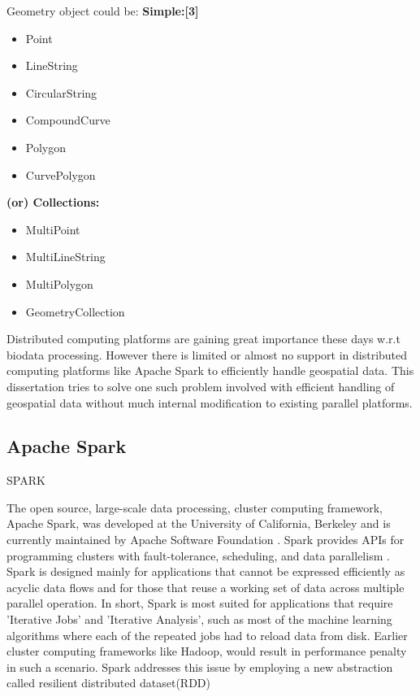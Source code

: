 \documentclass[article,type=msc,colorback,10pt,accentcolor=tud1d]{tudthesis}
\begin{document}
			   Geometry object could be:
			 \textbf{  Simple:[3]}
			 \begin{itemize}
			   \item  Point
			   \item  LineString
			   \item  CircularString
			   \item  CompoundCurve
			   \item  Polygon
			   \item  CurvePolygon
			 \end{itemize}
			   \textbf{(or) Collections:}
			  \begin{itemize}
			  	\item  MultiPoint
			    \item  MultiLineString
			    \item  MultiPolygon
			    \item  GeometryCollection
			  \end{itemize}
			  
			   Distributed computing platforms are gaining great importance these days w.r.t  biodata processing. However there is limited or almost no support in distributed computing platforms like Apache Spark to efficiently handle geospatial data. This dissertation tries to solve one such problem involved with efficient handling of geospatial data without much internal modification to existing parallel platforms.
			   
			   
		   \subsection{Apache Spark}
		   SPARK  \cite{sparkmainpaper}
		   
		   The open source, large-scale data processing, cluster computing framework, Apache Spark, was developed at the University of California, Berkeley and is currently maintained by Apache Software Foundation \cite{http://spark.apache.org/} . Spark provides APIs for programming clusters with fault-tolerance, scheduling, and data parallelism \cite{wiki: https://en.wikipedia.org/wiki/Apache_Spark}. Spark is designed mainly for applications that cannot be expressed efficiently as acyclic data flows and for those that reuse a working set of data across multiple parallel operation. In short, Spark is most suited for applications that require 'Iterative Jobs' and 'Iterative Analysis', such as most of the machine learning algorithms where each of the repeated jobs had to reload data from disk. Earlier cluster computing frameworks like Hadoop, would result in performance penalty in such a scenario. Spark addresses this issue by employing a new abstraction called resilient distributed dataset(RDD) \cite{sparkmainpaper}
		   
\end{document}
